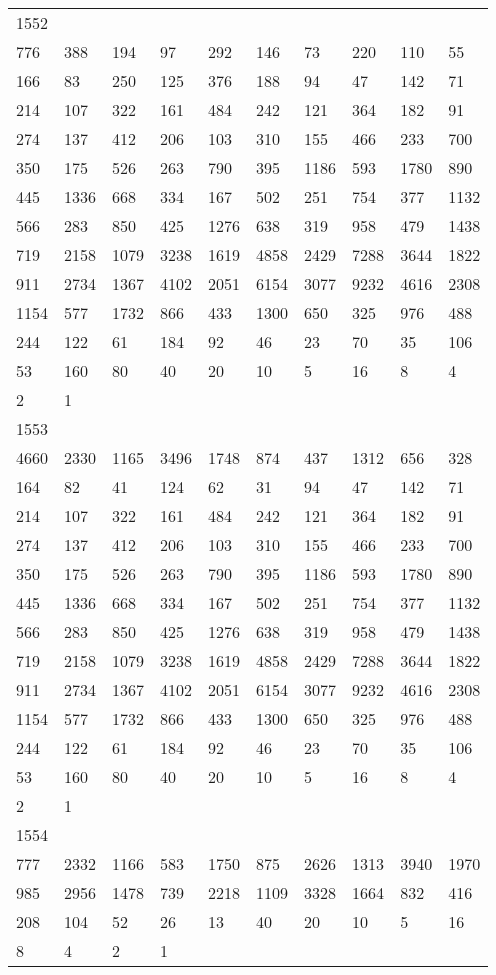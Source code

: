 \begin{longtable}{*{10}{l}}
1552&&&&&&&&&\\
776& 388& 194& 97& 292& 146& 73& 220& 110& 55\\
166& 83& 250& 125& 376& 188& 94& 47& 142& 71\\
214& 107& 322& 161& 484& 242& 121& 364& 182& 91\\
274& 137& 412& 206& 103& 310& 155& 466& 233& 700\\
350& 175& 526& 263& 790& 395& 1186& 593& 1780& 890\\
445& 1336& 668& 334& 167& 502& 251& 754& 377& 1132\\
566& 283& 850& 425& 1276& 638& 319& 958& 479& 1438\\
719& 2158& 1079& 3238& 1619& 4858& 2429& 7288& 3644& 1822\\
911& 2734& 1367& 4102& 2051& 6154& 3077& 9232& 4616& 2308\\
1154& 577& 1732& 866& 433& 1300& 650& 325& 976& 488\\
244& 122& 61& 184& 92& 46& 23& 70& 35& 106\\
53& 160& 80& 40& 20& 10& 5& 16& 8& 4\\
2& 1& \\

1553&&&&&&&&&\\
4660& 2330& 1165& 3496& 1748& 874& 437& 1312& 656& 328\\
164& 82& 41& 124& 62& 31& 94& 47& 142& 71\\
214& 107& 322& 161& 484& 242& 121& 364& 182& 91\\
274& 137& 412& 206& 103& 310& 155& 466& 233& 700\\
350& 175& 526& 263& 790& 395& 1186& 593& 1780& 890\\
445& 1336& 668& 334& 167& 502& 251& 754& 377& 1132\\
566& 283& 850& 425& 1276& 638& 319& 958& 479& 1438\\
719& 2158& 1079& 3238& 1619& 4858& 2429& 7288& 3644& 1822\\
911& 2734& 1367& 4102& 2051& 6154& 3077& 9232& 4616& 2308\\
1154& 577& 1732& 866& 433& 1300& 650& 325& 976& 488\\
244& 122& 61& 184& 92& 46& 23& 70& 35& 106\\
53& 160& 80& 40& 20& 10& 5& 16& 8& 4\\
2& 1& \\

1554&&&&&&&&&\\
777& 2332& 1166& 583& 1750& 875& 2626& 1313& 3940& 1970\\
985& 2956& 1478& 739& 2218& 1109& 3328& 1664& 832& 416\\
208& 104& 52& 26& 13& 40& 20& 10& 5& 16\\
8& 4& 2& 1& \\


\end{longtable}
